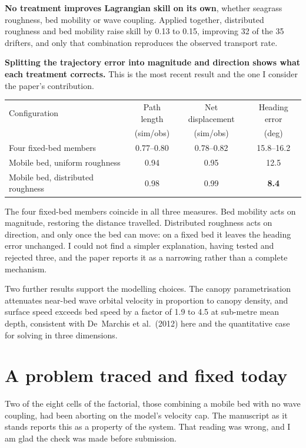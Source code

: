 \documentclass[11pt]{article}
\begin{document}
\textbf{No treatment improves Lagrangian skill on its own}, whether seagrass
roughness, bed mobility or wave coupling. Applied together, distributed
roughness and bed mobility raise skill by 0.13 to 0.15, improving 32 of the 35
drifters, and only that combination reproduces the observed transport rate.

\textbf{Splitting the trajectory error into magnitude and direction shows what
each treatment corrects.} This is the most recent result and the one I consider
the paper's contribution.

\begin{center}
\begin{tabular}{lccc}
\toprule
Configuration & Path length & Net displacement & Heading error \\
              & (sim/obs)   & (sim/obs)        & (deg) \\
\midrule
Four fixed-bed members & 0.77--0.80 & 0.78--0.82 & 15.8--16.2 \\
Mobile bed, uniform roughness & 0.94 & 0.95 & 12.5 \\
Mobile bed, distributed roughness & 0.98 & 0.99 & \textbf{8.4} \\
\bottomrule
\end{tabular}
\end{center}

The four fixed-bed members coincide in all three measures. Bed mobility acts on
magnitude, restoring the distance travelled. Distributed roughness acts on
direction, and only once the bed can move: on a fixed bed it leaves the heading
error unchanged. I could not find a simpler explanation, having tested and
rejected three, and the paper reports it as a narrowing rather than a complete
mechanism.

Two further results support the modelling choices. The canopy parametrisation
attenuates near-bed wave orbital velocity in proportion to canopy density, and
surface speed exceeds bed speed by a factor of 1.9 to 4.5 at sub-metre mean
depth, consistent with De~Marchis et al.\ (2012) here and the quantitative case
for solving in three dimensions.

\section{A problem traced and fixed today}

Two of the eight cells of the factorial, those combining a mobile bed with no
wave coupling, had been aborting on the model's velocity cap. The manuscript as
it stands reports this as a property of the system. That reading was wrong, and
I am glad the check was made before submission.
\end{document}
